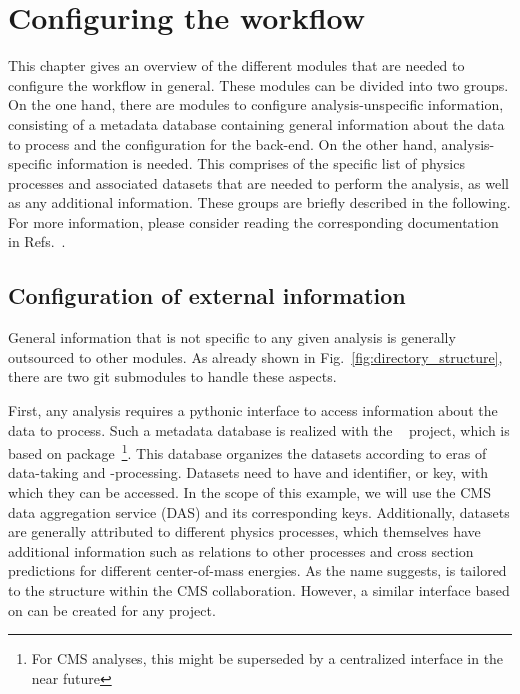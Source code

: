 \section{Configuring the workflow}\label{sec:configs}

%

This chapter gives an overview of the different modules that are needed to configure the workflow in general.
These modules can be divided into two groups.
On the one hand, there are modules to configure analysis-unspecific information, consisting of a metadata database containing general information about the data to process and the configuration for the  back-end.
On the other hand, analysis-specific information is needed.
This comprises of the specific list of physics processes and associated datasets that are needed to perform the analysis, as well as any additional information.
These groups are briefly described in the following.
For more information, please consider reading the corresponding documentation in Refs.~\cite{cf_repo,law,cmsdb,order}.

\subsection{Configuration of external information}

General information that is not specific to any given analysis is generally outsourced to other modules.
As already shown in Fig.~\ref{fig:directory_structure}, there are two git submodules to handle these aspects.

First, any analysis requires a pythonic interface to access information about the data to process.
Such a metadata database is realized with the ~\cite{cmsdb} project, which is based on  package~\cite{order}\footnote{For CMS analyses, this might be superseded by a centralized interface in the near future}.
This database organizes the datasets according to eras of data-taking and -processing.
Datasets need to have and identifier, or key, with which they can be accessed.
In the scope of this example, we will use the CMS data aggregation service (DAS) and its corresponding keys.
Additionally, datasets are generally attributed to different physics processes, which themselves have additional information such as relations to other processes and cross section predictions for different center-of-mass energies.
As the name suggests,  is tailored to the structure within the CMS collaboration.
However, a similar interface based on  can be created for any project. 

